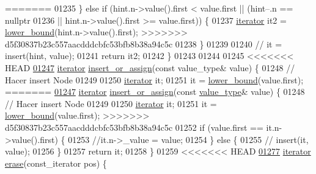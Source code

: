 \begin{DoxyCode}
=======
01235             \} \textcolor{keywordflow}{else} \textcolor{keywordflow}{if} (hint.n->value().first < value.first || (hint--.n == \textcolor{keyword}{nullptr}
01236             || hint.n->value().first >= value.first)) \{
01237             \hyperlink{classaed2_1_1iterator}{iterator} it2 = \hyperlink{classaed2_1_1map_a62075a47afdf89267c5462f88164af3d_a62075a47afdf89267c5462f88164af3d}{lower\_bound}(hint.n->value().first);
>>>>>>> d5f30837b23c557aacdddcbfc53bfb8b38a94c5c
01238         \}
01239 
01240        \textcolor{comment}{// it = insert(hint, value);}
01241         \textcolor{keywordflow}{return} it2;
01242     \}
01243  
01244     
01245 
<<<<<<< HEAD
\hypertarget{map3_8h_source_l01247}{}\hyperlink{classaed2_1_1map_a9128a806713bcc999ebd8a97ab77e765_a9128a806713bcc999ebd8a97ab77e765}{01247}     \hyperlink{classaed2_1_1iterator}{iterator} \hyperlink{classaed2_1_1map_a9128a806713bcc999ebd8a97ab77e765_a9128a806713bcc999ebd8a97ab77e765}{insert_or_assign}(\textcolor{keyword}{const} value\_type& value) \{
01248                 \textcolor{comment}{// Hacer insert Node}
01249 
01250           \hyperlink{classaed2_1_1iterator}{iterator} it;
01251         it = \hyperlink{classaed2_1_1map_a3399d36fdd5a880b494f3a5795d3f18f_a3399d36fdd5a880b494f3a5795d3f18f}{lower_bound}(value.first);
=======
\hyperlink{classaed2_1_1map_a9128a806713bcc999ebd8a97ab77e765_a9128a806713bcc999ebd8a97ab77e765}{01247}     \hyperlink{classaed2_1_1iterator}{iterator} \hyperlink{classaed2_1_1map_a9128a806713bcc999ebd8a97ab77e765_a9128a806713bcc999ebd8a97ab77e765}{insert\_or\_assign}(\textcolor{keyword}{const} \hyperlink{classaed2_1_1map_a719db98e0ff9a837610f76be33264680_a719db98e0ff9a837610f76be33264680}{value\_type}& value) \{
01248                 \textcolor{comment}{// Hacer insert Node}
01249 
01250           \hyperlink{classaed2_1_1iterator}{iterator} it;
01251         it = \hyperlink{classaed2_1_1map_a62075a47afdf89267c5462f88164af3d_a62075a47afdf89267c5462f88164af3d}{lower\_bound}(value.first);
>>>>>>> d5f30837b23c557aacdddcbfc53bfb8b38a94c5c
01252         \textcolor{keywordflow}{if} (value.first == it.n->value().first) \{
01253             \textcolor{comment}{//it.n->\_value = value;}
01254         \} \textcolor{keywordflow}{else} \{
01255            \textcolor{comment}{// insert(it, value);}
01256         \}
01257         \textcolor{keywordflow}{return} it;
01258     \}
01259 
<<<<<<< HEAD
\hypertarget{map3_8h_source_l01277}{}\hyperlink{classaed2_1_1map_ad8e796bf9c9c558e5ce6b61e116253fe_ad8e796bf9c9c558e5ce6b61e116253fe}{01277}     \hyperlink{classaed2_1_1iterator}{iterator} \hyperlink{classaed2_1_1map_ad8e796bf9c9c558e5ce6b61e116253fe_ad8e796bf9c9c558e5ce6b61e116253fe}{erase}(const\_iterator pos) \{

\end{DoxyCode}
